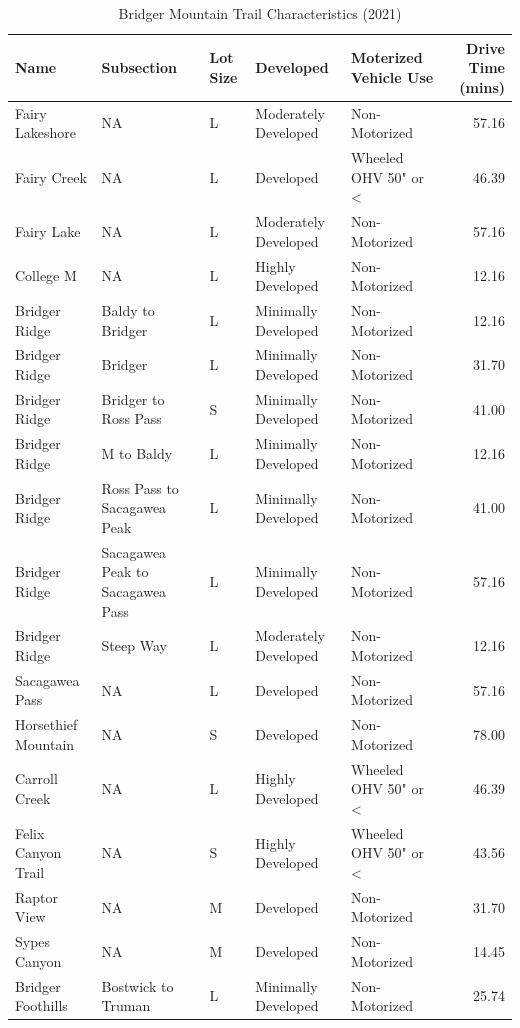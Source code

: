 \documentclass[
]{book}
\begin{document}
\begin{landscape}\begin{table}

\caption{\label{tab:table-char}Bridger Mountain Trail Characteristics (2021)}
\centering
\fontsize{7}{9}\selectfont
\begin{tabular}[t]{lllllr}
\toprule
Name & Subsection & Lot Size & Developed & Moterized Vehicle Use & Drive Time (mins)\\
\midrule
Fairy Lakeshore & NA & L & Moderately Developed & Non-Motorized & 57.16\\
Fairy Creek & NA & L & Developed & Wheeled OHV 50" or < & 46.39\\
Fairy Lake & NA & L & Moderately Developed & Non-Motorized & 57.16\\
College M & NA & L & Highly Developed & Non-Motorized & 12.16\\
Bridger Ridge & Baldy to Bridger & L & Minimally Developed & Non-Motorized & 12.16\\
\addlinespace
Bridger Ridge & Bridger & L & Minimally Developed & Non-Motorized & 31.70\\
Bridger Ridge & Bridger to Ross Pass & S & Minimally Developed & Non-Motorized & 41.00\\
Bridger Ridge & M to Baldy & L & Minimally Developed & Non-Motorized & 12.16\\
Bridger Ridge & Ross Pass to Sacagawea Peak & L & Minimally Developed & Non-Motorized & 41.00\\
Bridger Ridge & Sacagawea Peak to Sacagawea Pass & L & Minimally Developed & Non-Motorized & 57.16\\
\addlinespace
Bridger Ridge & Steep Way & L & Moderately Developed & Non-Motorized & 12.16\\
Sacagawea Pass & NA & L & Developed & Non-Motorized & 57.16\\
Horsethief Mountain & NA & S & Developed & Non-Motorized & 78.00\\
Carroll Creek & NA & L & Highly Developed & Wheeled OHV 50" or < & 46.39\\
Felix Canyon Trail & NA & S & Highly Developed & Wheeled OHV 50" or < & 43.56\\
\addlinespace
Raptor View & NA & M & Developed & Non-Motorized & 31.70\\
Sypes Canyon & NA & M & Developed & Non-Motorized & 14.45\\
Bridger Foothills & Bostwick to Truman & L & Minimally Developed & Non-Motorized & 25.74\\

\end{tabular}
\end{table}
\end{landscape}
\end{document}
